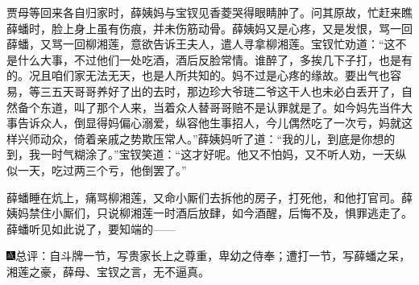 贾母等回来各自归家时，薛姨妈与宝钗见香菱哭得眼睛肿了。问其原故，忙赶来瞧薛蟠时，脸上身上虽有伤痕，并未伤筋动骨。薛姨妈又是心疼，又是发恨，骂一回薛蟠，又骂一回柳湘莲，意欲告诉王夫人，遣人寻拿柳湘莲。宝钗忙劝道：``这不是什么大事，不过他们一处吃酒，酒后反脸常情。谁醉了，多挨几下子打，也是有的。况且咱们家无法无天，也是人所共知的。妈不过是心疼的缘故。要出气也容易，等三五天哥哥养好了出的去时，那边珍大爷琏二爷这干人也未必白丢开了，自然备个东道，叫了那个人来，当着众人替哥哥赔不是认罪就是了。如今妈先当件大事告诉众人，倒显得妈偏心溺爱，纵容他生事招人，今儿偶然吃了一次亏，妈就这样兴师动众，倚着亲戚之势欺压常人。''薛姨妈听了道：``我的儿，到底是你想的到，我一时气糊涂了。''宝钗笑道：``这才好呢。他又不怕妈，又不听人劝，一天纵似一天，吃过两三个亏，他倒罢了。''

薛蟠睡在炕上，痛骂柳湘莲，又命小厮们去拆他的房子，打死他，和他打官司。薛姨妈禁住小厮们，只说柳湘莲一时酒后放肆，如今酒醒，后悔不及，惧罪逃走了。薛蟠听见如此说了，要知端的------

{\includegraphics[width=3mm]{../Images/00005}总评：自斗牌一节，写贵家长上之尊重，卑幼之侍奉；遭打一节，写薛蟠之呆，湘莲之豪，薛母、宝钗之言，无不逼真。}
